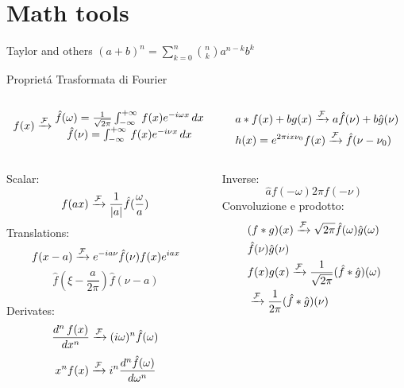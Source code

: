 \section{Math tools}

\begin{wordonframe}{Taylor and others}
$(a+b)^n=\sum_{k=0}^n\binom{n}{k}a^{n-k}b^k$
\end{wordonframe}

\begin{wordonframe}{Propriet\'a Trasformata di Fourier}
\begin{columns}
\begin{column}{0.5\textwidth}
\begin{align*}
f(x)\xrightarrow{\mathcal{F}}{}\begin{matrix}
\hat{f}(\omega)=\frac{1}{\sqrt{2\pi}}\int_{-\infty}^{+\infty}\,f(x)e^{-i\omega x}\,dx\\
\hat{f}(\nu)=\int_{-\infty}^{+\infty}\,f(x)e^{-i\nu x}\,dx\\
\end{matrix}
\end{align*}
\end{column}

\begin{column}{0.5\textwidth}
\begin{align*}
&a*f(x)+bg(x)\xrightarrow{\mathcal{F}}{}a\hat{f}(\nu)+b\hat{g}(\nu)\\
&h(x)=e^{2\pi ix\nu_0}f(x)\xrightarrow{\mathcal{F}}{}\hat{f}(\nu-\nu_0)
\end{align*}
\end{column}
\end{columns}

\begin{columns}
\begin{column}{0.5\textwidth}
Scalar: \[f(ax)\xrightarrow{\mathcal{F}}{}\frac{1}{|a|}\hat{f}(\frac{\omega}{a}) \]
Translations:
\[f(x-a)\xrightarrow{\mathcal{F}}{}e^{-ia\nu}\hat{f}(\nu)f(x)e^{iax}\]
\[\hat{f}(\xi-\frac{a}{2\pi}) \hat{f}(\nu-a)\]

Derivates:
\[\frac{d^n\,f(x)}{dx^n}\xrightarrow{\mathcal{F}}{}(i\omega)^n\hat{f}(\omega)\]
\[x^nf(x)\xrightarrow{\mathcal{F}}{}i^n\frac{d^n\hat{f}(\omega)}{d\omega^n}\]
\end{column}
\begin{column}{0.5\textwidth}
Inverse: \[\hat{a} f(-\omega) 2\pi f(-\nu)\]
Convoluzione e prodotto:
\begin{align*}
&(f*g)(x)\xrightarrow{\mathcal{F}}{}\sqrt{2\pi}\hat{f}(\omega)\hat{g}(\omega)\\
&\hat{f}(\nu)\hat{g}(\nu)\\
&f(x)g(x)\xrightarrow{\mathcal{F}}{}\frac{1}{\sqrt{2\pi}}(\hat{f}*\hat{g})(\omega)\\
&\xrightarrow{\mathcal{F}}{}\frac{1}{2\pi}(\hat{f}*\hat{g})(\nu)
\end{align*}

\end{column}
\end{columns}
\end{wordonframe}

